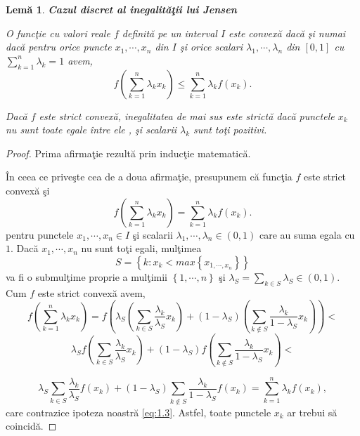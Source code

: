 \documentclass[a4paper,12pt,oneside]{report}
\newtheorem{lemma}{Lem\u{a}}
\begin{document}
\begin{lemma}
\textbf{Cazul discret al inegalit\u{a}\c{t}ii lui Jensen}

O func\c{t}ie cu valori reale \(f\) definit\u{a} pe un interval \(I\) este convex\u{a} dac\u{a} \c{s}i numai dac\u{a} pentru orice puncte \(x_{1},\cdots,x_{n}\) din \(I\) \c{s}i orice scalari \(\lambda _{1},\cdots,\lambda _{n}\) din \(\left [ 0 , 1 \right ]\) cu \(\sum_{k = 1}^{n}\lambda _{k}= 1\) avem,
\begin{displaymath}
  f\left ( \sum_{k = 1}^{n} \lambda _{k}x_{k}\right )\leq \sum_{k = 1}^{n}\lambda _{k}f\left ( x_{k} \right ).
\end{displaymath}

Dac\u{a} \(f\) este strict convex\u{a}, inegalitatea de mai sus este strict\u{a} dac\u{a} punctele \(x_{k}\) nu sunt toate egale \^{i}ntre ele , \c{s}i scalarii \(\lambda _{k}\) sunt to\c{t}i pozitivi.
\end{lemma}
\begin{proof}
Prima afirma\c{t}ie rezult\u{a} prin induc\c{t}ie matematic\u{a}.

\^{I}n ceea ce prive\c{s}te cea de a doua afirma\c{t}ie, presupunem c\u{a} func\c{t}ia \(f\) este strict convex\u{a} \c{s}i
\begin{displaymath}
  f\left ( \sum_{k = 1}^{n} \lambda _{k}x_{k}\right )=  \sum_{k = 1}^{n}\lambda _{k}f\left ( x_{k} \right ). \label{eq:1.3} \tag{1.3}
\end{displaymath}
pentru  punctele \(x_{1}, \cdots, x_{n} \in I\) \c{s}i scalarii \(\lambda _{1}, \cdots, \lambda _{n} \in \left ( 0 , 1\right )\) care au suma egala cu \(1\). Dac\u{a} \(x_{1}, \cdots, x_{n}\) nu sunt to\c{t}i egali, mul\c{t}imea
\[S = \left \{ k: x_{k}<  max \left \{ x_{1,\cdots,x_{n}} \right \} \right \}\]
 va fi o submul\c{t}ime proprie a mul\c{t}imii  \(\left \{ 1,\cdots,n \right \}\) \c{s}i \(\lambda _{S} = \sum_{k \in S}^{}\lambda _{S} \in \left ( 0,1 \right )\). Cum \(f\) este strict convex\u{a} avem,
\begin{displaymath}
  f\left ( \sum_{k=1}^{n}\lambda _{k}x_{k} \right ) = f\left ( \lambda _{S}\left ( \sum_{k\in S}^{}\frac{\lambda _{k}}{\lambda _{S}} x_{k}\right ) +\left ( 1-\lambda _{S} \right )\left ( \sum_{k\notin S}^{} \frac{\lambda _{k}}{1 - \lambda _{S}}x_{k}\right )\right ) <
\end{displaymath}
\begin{displaymath}
  \lambda _{S}f\left ( \sum_{k\in S}^{}\frac{\lambda _{k}}{\lambda _{S}} x_{k}\right ) +\left ( 1 - \lambda _{S} \right )f\left ( \sum_{k\notin S}^{}\frac{\lambda _{k}}{1 - \lambda _{S}} x_{k}\right ) <
\end{displaymath}

\begin{displaymath}
  \lambda _{S} \sum_{k\in S}^{}\frac{\lambda _{k}}{\lambda _{S}} f\left ( x_{k} \right ) +\left ( 1 - \lambda _{S} \right ) \sum_{k\notin S}^{}\frac{\lambda _{k}}{1 - \lambda _{S}}f\left ( x_{k} \right )= \sum_{k=1}^{n}\lambda _{k}f\left ( x_{k} \right ),
\end{displaymath}
care contrazice ipoteza noastr\u{a} \ref{eq:1.3}. Astfel, toate punctele \(x_{k}\) ar trebui s\u{a} coincid\u{a}.
\end{proof}
\end{document}
